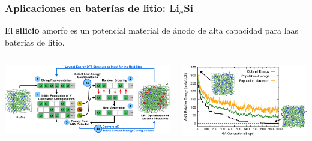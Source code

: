 \documentclass[aspectratio=169]{beamer}
\let\oldtextbf\textbf
\renewcommand{\textbf}[1]{\textcolor{nordblue}{\oldtextbf{#1}}}
\begin{document}
    \begin{frame}
        \frametitle{Aplicaciones en baterías de litio: Li$_x$Si}
        
        El \textbf{silicio} amorfo es un potencial material de ánodo de alta
        capacidad para laas baterías de litio.
        
        \begin{columns}
            \begin{center}
                \includegraphics[width=\columnwidth]{LiSi-metodo.png}
            \end{center}

            \begin{center}
                \includegraphics[width=\columnwidth]{LiSi-optimizacion_de_la_energia.png}
            \end{center}
        \end{columns}
            
    \end{frame}
    
\end{document}
